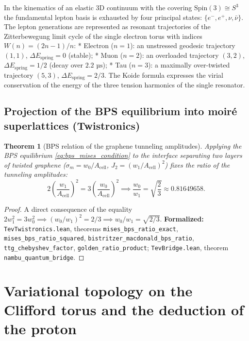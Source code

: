 \documentclass[11pt,a4paper]{article}
\newtheorem{theorem}{Theorem}
\theoremstyle{definition}
\theoremstyle{remark}
\begin{document}
In the kinematics of an elastic 3D continuum with the covering $\mathrm{Spin}(3) \cong S^3$ the fundamental lepton basis is exhausted by four principal states: $\{e^-, e^+, \nu, \bar{\nu}\}$. The lepton generations are represented as resonant trajectories of the Zitterbewegung limit cycle of the single electron torus with indices $W(n) = (2n-1)/n$:
* Electron ($n=1$): an unstressed geodesic trajectory $(1,1)$, $\Delta E_{\mathrm{spring}} = 0$ (stable);
* Muon ($n=2$): an overloaded trajectory $(3,2)$, $\Delta E_{\mathrm{spring}} = 1/2$ (decay over $2.2\text{ µs}$);
* Tau ($n=3$): a maximally over-twisted trajectory $(5,3)$, $\Delta E_{\mathrm{spring}} = 2/3$.
The Koide formula expresses the virial conservation of the energy of the three tension harmonics of the single resonator.

\subsection{Projection of the BPS equilibrium into moiré superlattices (Twistronics)}

\begin{theorem}[BPS relation of the graphene tunneling amplitudes]
\label{thm:twistronics_bps_ratio}
Applying the BPS equilibrium \eqref{eq:bps_mises_condition} to the interface separating two layers of twisted graphene ($\sigma_m = w_0/A_{\mathrm{cell}}$, $J_2 = (w_1/A_{\mathrm{cell}})^2$)  fixes the ratio of the tunneling amplitudes:
\begin{equation}
    2 \left(\frac{w_1}{A_{\mathrm{cell}}}\right)^2 = 3 \left(\frac{w_0}{A_{\mathrm{cell}}}\right)^2 \implies \frac{w_0}{w_1} = \sqrt{\frac{2}{3}} \approx 0.81649658.
    \label{eq:twist_bps_ratio_exact}
\end{equation}
\end{theorem}
\begin{proof}
A direct consequence of the equality $2 w_1^2 = 3 w_0^2 \implies (w_0/w_1)^2 = 2/3 \implies w_0/w_1 = \sqrt{2/3}$.
\noindent\small\textbf{Formalized:} \texttt{TevTwistronics.lean}, theorems \texttt{mises_bps_ratio_exact}, \texttt{mises_bps_ratio_squared}, \texttt{bistritzer_macdonald_bps_ratio}, \texttt{ttg\_chebyshev\_factor}, \texttt{golden\_ratio\_product}; \texttt{TevBridge.lean}, theorem \texttt{nambu_quantum_bridge}.
\end{proof}
\section{Variational topology on the Clifford torus and the deduction of the proton}
\end{document}
